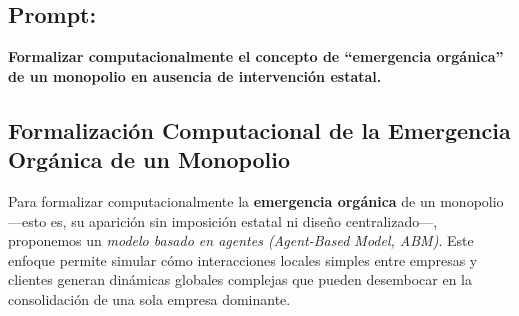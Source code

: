 \documentclass[a4paper,12pt]{article}
\begin{document}
\subsection*{Prompt:}
\textbf{Formalizar computacionalmente el concepto de “emergencia orgánica” de un monopolio en ausencia de intervención estatal.}

\subsection*{Formalización Computacional de la Emergencia Orgánica de un Monopolio}

Para formalizar computacionalmente la \textbf{emergencia orgánica} de un monopolio —esto es, su aparición sin imposición estatal ni diseño centralizado—, proponemos un \textit{modelo basado en agentes (Agent-Based Model, ABM)}. Este enfoque permite simular cómo interacciones locales simples entre empresas y clientes generan dinámicas globales complejas que pueden desembocar en la consolidación de una sola empresa dominante.
\end{document}
